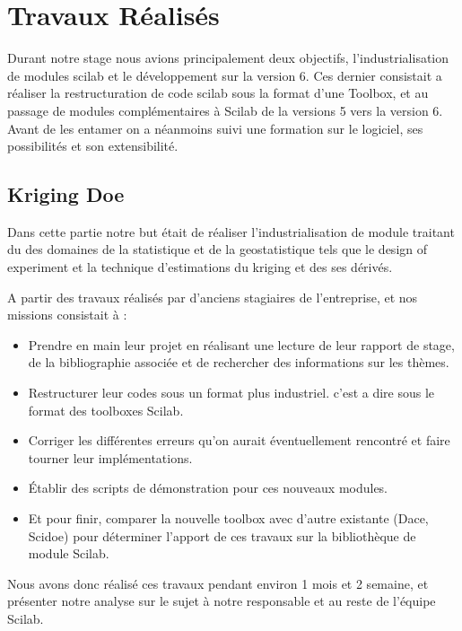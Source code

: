 \section*{Travaux Réalisés}

Durant notre stage nous avions principalement deux objectifs,
l’industrialisation de modules scilab et le développement sur
la version 6.
Ces dernier consistait a réaliser la restructuration de code scilab sous
la format d’une Toolbox, et au passage de modules complémentaires
à Scilab de la versions 5 vers la version 6.
Avant de les entamer on a néanmoins suivi une formation sur le logiciel,
ses possibilités et son extensibilité.

\subsection*{Kriging Doe}

Dans cette partie notre but était de réaliser l’industrialisation de module
traitant du des domaines de la statistique et de la geostatistique tels que
le design of experiment et la technique d’estimations du kriging et des ses dérivés.

A partir des travaux réalisés par d’anciens stagiaires de l’entreprise,
et nos missions consistait à :

\begin{itemize}
    \item Prendre en main leur projet en réalisant une lecture
        de leur rapport de stage, de la bibliographie associée
        et de rechercher des informations sur les thèmes.
    \item Restructurer leur codes sous un format plus industriel.
        c’est a dire sous le format des toolboxes Scilab.
    \item Corriger les différentes erreurs qu’on aurait
        éventuellement rencontré et faire tourner leur implémentations.
    \item Établir des scripts de démonstration pour ces nouveaux modules.
    \item Et pour finir, comparer la nouvelle toolbox avec d’autre
        existante (Dace, Scidoe) pour déterminer l’apport de ces
        travaux sur la bibliothèque de module Scilab.
\end{itemize}

Nous avons donc réalisé ces travaux pendant environ 1 mois et 2 semaine,
et présenter notre analyse sur le sujet à notre responsable et au reste de l’équipe Scilab.

